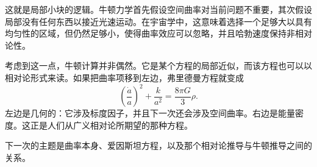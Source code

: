 这就是局部小块的逻辑。牛顿力学首先假设空间曲率对当前问题不重要，其次假设局部没有任何东西以接近光速运动。在宇宙学中，这意味着选择一个足够大以具有均匀性的区域，但仍然足够小，使得曲率效应可以忽略，并且哈勃速度保持非相对论性。

考虑到这一点，牛顿计算并非偶然。它是某个方程的局部近似，而该方程也可以以相对论形式来读。如果把曲率项移到左边，弗里德曼方程就变成
\begin{equation}
\left(\frac{\dot a}{a}\right)^2+\frac{k}{a^2}=\frac{8\pi G}{3}\rho.
\end{equation}
左边是几何的：它涉及标度因子，并且下一次还会涉及空间曲率。右边是能量密度。这正是人们从广义相对论所期望的那种方程。

下一次的主题是曲率本身、爱因斯坦方程，以及那个相对论推导与牛顿推导之间的关系。
